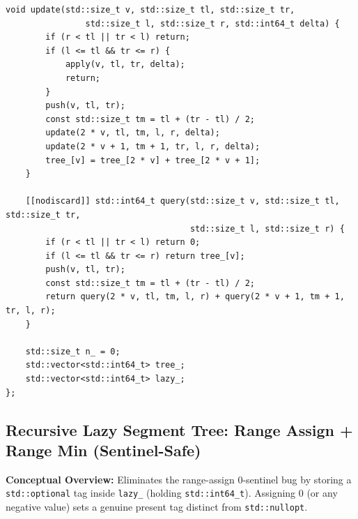 \documentclass[11pt,a4paper]{article}
\theoremstyle{definition}
\begin{document}
\begin{lstlisting}[caption={Recursive $4N$ Lazy Segment Tree for $O(\log N)$ range addition and range sum.}]
    void update(std::size_t v, std::size_t tl, std::size_t tr,
                std::size_t l, std::size_t r, std::int64_t delta) {
        if (r < tl || tr < l) return;
        if (l <= tl && tr <= r) {
            apply(v, tl, tr, delta);
            return;
        }
        push(v, tl, tr);
        const std::size_t tm = tl + (tr - tl) / 2;
        update(2 * v, tl, tm, l, r, delta);
        update(2 * v + 1, tm + 1, tr, l, r, delta);
        tree_[v] = tree_[2 * v] + tree_[2 * v + 1];
    }

    [[nodiscard]] std::int64_t query(std::size_t v, std::size_t tl, std::size_t tr,
                                     std::size_t l, std::size_t r) {
        if (r < tl || tr < l) return 0;
        if (l <= tl && tr <= r) return tree_[v];
        push(v, tl, tr);
        const std::size_t tm = tl + (tr - tl) / 2;
        return query(2 * v, tl, tm, l, r) + query(2 * v + 1, tm + 1, tr, l, r);
    }

    std::size_t n_ = 0;
    std::vector<std::int64_t> tree_;
    std::vector<std::int64_t> lazy_;
};
\end{lstlisting}

\subsection{Recursive Lazy Segment Tree: Range Assign + Range Min (Sentinel-Safe)}

\textbf{Conceptual Overview:} Eliminates the range-assign $0$-sentinel bug by storing a \texttt{std::optional} tag inside \texttt{lazy\_} (holding \texttt{std::int64\_t}). Assigning $0$ (or any negative value) sets a genuine present tag distinct from \texttt{std::nullopt}.
\end{document}
